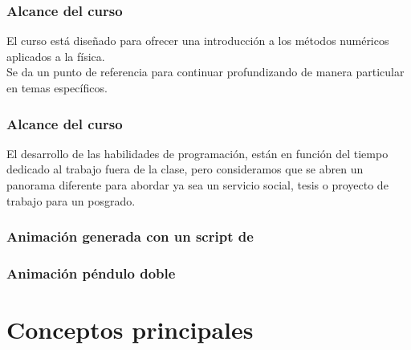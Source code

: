 \begin{frame}[fragile]
\begin{figure}
\centering

\end{figure}
\end{frame}
\begin{frame}
\frametitle{Alcance del curso}
El curso está diseñado para ofrecer una introducción a los métodos numéricos aplicados a la física.
\\
\medskip
Se da un punto de referencia para continuar profundizando de manera particular en temas específicos. 
\end{frame}
\begin{frame}
\frametitle{Alcance del curso}
El desarrollo de las habilidades de programación, están en función del tiempo dedicado al trabajo fuera de la clase, pero consideramos que se abren un panorama diferente para abordar ya sea un servicio social, tesis o proyecto de trabajo para un posgrado.
\end{frame}
\begin{frame}[fragile]
\frametitle{Animación generada con un script de \python}
\begin{center}
\end{center}
\end{frame}
\begin{frame}[fragile]
\frametitle{Animación péndulo doble}
\begin{center}
\end{center}
\end{frame}
\section{Conceptos principales}
